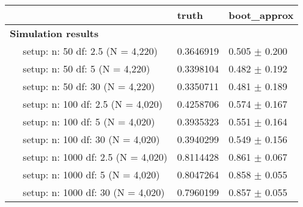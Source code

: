 \documentclass{article}
\begin{document}
\begin{tabular}{l|l|l}
    \hline
     & truth & boot_approx\\
    \hline
    \bf{Simulation results} & ~ & ~\\
    \hline
    ~~ setup: n: 50 df: 2.5 (N = 4,220) & 0.3646919 & 0.505 $\pm$ 0.200\\
    \hline
    ~~ setup: n: 50 df: 5 (N = 4,220) & 0.3398104 & 0.482 $\pm$ 0.192\\
    \hline
    ~~ setup: n: 50 df: 30 (N = 4,220) & 0.3350711 & 0.481 $\pm$ 0.189\\
    \hline
    ~~ setup: n: 100 df: 2.5 (N = 4,020) & 0.4258706 & 0.574 $\pm$ 0.167\\
    \hline
    ~~ setup: n: 100 df: 5 (N = 4,020) & 0.3935323 & 0.551 $\pm$ 0.164\\
    \hline
    ~~ setup: n: 100 df: 30 (N = 4,020) & 0.3940299 & 0.549 $\pm$ 0.156\\
    \hline
    ~~ setup: n: 1000 df: 2.5 (N = 4,020) & 0.8114428 & 0.861 $\pm$ 0.067\\
    \hline
    ~~ setup: n: 1000 df: 5 (N = 4,020) & 0.8047264 & 0.858 $\pm$ 0.055\\
    \hline
    ~~ setup: n: 1000 df: 30 (N = 4,020) & 0.7960199 & 0.857 $\pm$ 0.055\\
    \hline
    \end{tabular}
\end{document}
